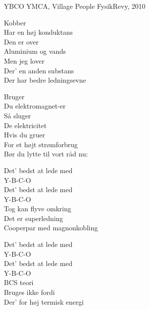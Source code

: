 \begin{song}{YBCO}
  {} %
  {YMCA, Village People} %
  {} %
  {FysikRevy, 2010} %
  {\NotCCLIed} %

  \begin{SBVerse}
    Kobber\\
    Har en høj konduktans\\
    Den er over\\
    Aluminium og vands\\
    Men jeg lover\\
    Der' en anden substans\\
    Der har bedre ledningsevne
  \end{SBVerse}

  \begin{SBVerse}
    Bruger\\
    Du elektromagnet-er\\
    Så sluger\\
    De elektricitet\\
    Hvis du gruer\\
    For et højt strømforbrug\\
    Bør du lytte til vort råd nu:
  \end{SBVerse}

  \begin{SBChorus}
    Det' bedst at lede med\\
    Y-B-C-O\\
    Det' bedst at lede med\\
    Y-B-C-O\\
    Tog kan flyve omkring\\
    Det er superledning\\
    Cooperpar med magnonkobling
  \end{SBChorus}

  \begin{SBChorus}
    Det' bedst at lede med\\
    Y-B-C-O\\
    Det' bedst at lede med\\
    Y-B-C-O\\
    BCS teori\\
    Bruges ikke fordi\\
    Der' for høj termisk energi
  \end{SBChorus}


\end{song}

